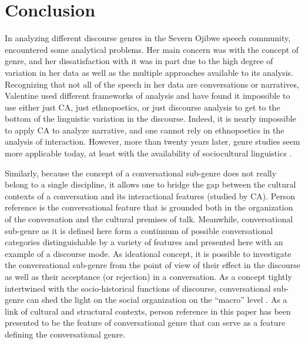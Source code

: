 \documentclass[12pt]{article}
\begin{document}
\section{Conclusion}
In analyzing different discourse genres in the Severn Ojibwe speech community, \textcite{valentine1995} encountered some analytical problems. Her main concern was with the concept of genre, and her dissatisfaction with it was in part due to the high degree of variation in her data as well as the multiple approaches available to its analysis. Recognizing that not all of the speech in her data are conversations or narratives, Valentine used different frameworks of analysis and have found it impossible to use either just CA, just ethnopoetics, or just discourse analysis to get to the bottom of the linguistic variation in the discourse. Indeed, it is nearly impossible to apply CA to analyze narrative, and one cannot rely on ethnopoetics in the analysis of interaction. However, more than twenty years later, genre studies seem more applicable today, at least with the availability of sociocultural linguistics \parencite{bucholtz2008}.

Similarly, because the concept of a conversational sub-genre does not really belong to a single discipline, it allows one to bridge the gap between the cultural contexts of a conversation and its interactional features (studied by CA). Person reference is the conversational feature that is grounded both in the organization of the conversation and the cultural premises of talk. Meanwhile, conversational sub-genre as it is defined here form a continuum of possible conversational categories distinguishable by a variety of features and presented here with an example of a discourse mode. As ideational concept, it is possible to investigate the conversational sub-genre from the point of view of their effect in the discourse as well as their acceptance (or rejection) in a conversation. As a concept tightly intertwined with the socio-historical functions of discourse, conversational sub-genre can shed the light on the social organization on the ``macro'' level \parencite{mayes2005}. As a link of cultural and structural contexts, person reference in this paper has been presented to be the feature of conversational genre that can serve as a feature defining the conversational genre.
\printbibliography
\end{document}
